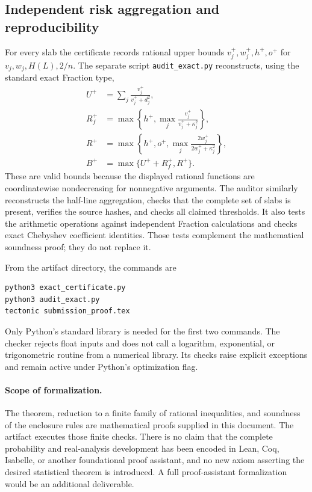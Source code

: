 \subsection{Independent risk aggregation and reproducibility}
For every slab the certificate records rational upper bounds
$v_j^+,w_j^+,h^+,o^+$ for $v_j,w_j,H(L),2/n$.
The separate script \texttt{audit\_exact.py} reconstructs, using the standard
exact Fraction type,
\begin{align*}
 U^+&=\sum_j\frac{v_j^+}{v_j^++d_j^2},\\
 R_f^+&=\max\left\{h^+,\max_j\frac{v_j^+}{v_j^++\kappa_j^2}\right\},\\
 R^+&=\max\left\{h^+,o^+,\max_j\frac{2w_j^+}{2w_j^++\kappa_j^2}\right\},\\
 B^+&=\max\{U^++R_f^+,R^+\}.
\end{align*}
These are valid bounds because the displayed rational functions are
coordinatewise nondecreasing for nonnegative arguments.
The auditor similarly reconstructs the half-line aggregation, checks that
the complete set of slabs is present, verifies the source hashes, and checks
all claimed thresholds. It also tests the arithmetic operations against
independent Fraction calculations and checks exact Chebyshev coefficient
identities. Those tests complement the mathematical soundness proof;
they do not replace it.

From the artifact directory, the commands are
\begin{verbatim}
python3 exact_certificate.py
python3 audit_exact.py
tectonic submission_proof.tex
\end{verbatim}
Only Python's standard library is needed for the first two commands.
The checker rejects float inputs and does not call a logarithm, exponential,
or trigonometric routine from a numerical library. Its checks raise explicit
exceptions and remain active under Python's optimization flag.

\paragraph{Scope of formalization.}
The theorem, reduction to a finite family of rational inequalities, and
soundness of the enclosure rules are mathematical proofs supplied in this
document. The artifact executes those finite checks. There is no claim that
the complete probability and real-analysis development has been encoded in
Lean, Coq, Isabelle, or another foundational proof assistant, and no new
axiom asserting the desired statistical theorem is introduced. A full
proof-assistant formalization would be an additional deliverable.
